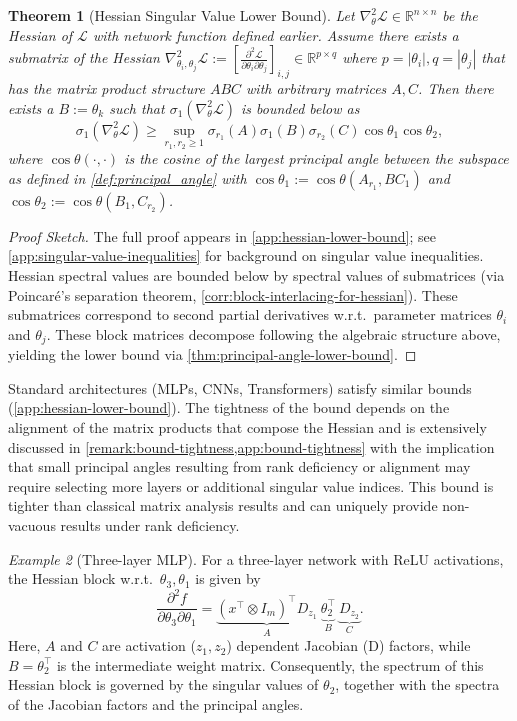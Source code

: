 \documentclass{article}
\newcommand{\prinangle}{\cos\theta}
\theoremstyle{plain}
\newtheorem{theorem}{Theorem}
\theoremstyle{definition}
\theoremstyle{remark}
\newtheorem{example}[theorem]{Example}
\begin{document}
\begin{theorem}[Hessian Singular Value Lower Bound]
\label{thm:hessian-singular-value-bound}
Let $\nabla^2_{\theta}\mathcal{L} \in \mathbb{R}^{n \times n}$ be the Hessian of $\mathcal{L}$ with network function defined earlier. Assume there exists a submatrix of the Hessian $\nabla^2_{\theta_i,\theta_j} \mathcal{L} :=  \left[\frac{\partial^2 \mathcal{L}}{\partial \theta_i \partial \theta_j}\right]_{i, j} \in \mathbb{R}^{p \times q}$ where $p = |\theta_i|, q = |\theta_j|$ that has the matrix product structure $ABC$ with arbitrary matrices $A,C$. Then there exists a $B := \theta_k$ such that  $\sigma_1(\nabla^2_{\theta}\mathcal{L})$ is bounded below as \[
\sigma_1(\nabla^2_{\theta}\mathcal{L}) \geq \sup_{r_1,r_2 \geq 1} \sigma_{r_1}(A)\sigma_{1}(B)\sigma_{r_2}(C) \prinangle_1\prinangle_2,
\] where $\prinangle(\cdot, \cdot)$ is the cosine of the largest principal angle between the subspace as defined in \cref{def:principal_angle} with $\prinangle_1 := \prinangle(A_{r_1},BC_1)$ and $\prinangle_2 :=\prinangle(B_1, C_{r_2})$.
\end{theorem}

\begin{proof}[Proof Sketch]
The full proof appears in \cref{app:hessian-lower-bound}; see \cref{app:singular-value-inequalities} for background on singular value inequalities. Hessian spectral values are bounded below by spectral values of submatrices (via Poincaré's separation theorem, \cref{corr:block-interlacing-for-hessian}). These submatrices correspond to second partial derivatives w.r.t.\ parameter matrices $\theta_i$ and $\theta_j$. These block matrices decompose following the algebraic structure above, yielding the lower bound via \cref{thm:principal-angle-lower-bound}.
\end{proof}

Standard architectures (MLPs, CNNs, Transformers) satisfy similar bounds (\cref{app:hessian-lower-bound}). The tightness of the bound depends on the alignment of the matrix products that compose the Hessian and is extensively discussed in \cref{remark:bound-tightness,app:bound-tightness} with the implication that small principal angles resulting from rank deficiency or alignment may require selecting more layers or additional singular value indices. This bound is tighter than classical matrix analysis results \citep{Horn_Johnson_1991, bhatia2013matrix} and can uniquely provide non-vacuous results under rank deficiency.

\begin{example}[Three-layer MLP]
For a three-layer network with ReLU activations, the Hessian block w.r.t.\ $\theta_3,\theta_1$ is given by \[
\frac{\partial^2 f}{\partial \theta_3 \partial \theta_1} =
\underbrace{(x^{\top} \otimes I_{m})^{\top} D_{z_1}}_{A} 
\:
\underbrace{\theta_2^{\top}}_B\:\underbrace{D_{z_2}}_C.
\] Here, $A$ and $C$ are activation ($z_1,z_2$) dependent Jacobian (D) factors, while $B=\theta_2^{\top}$ is the intermediate weight matrix. Consequently, the spectrum of this Hessian block is governed by the singular values of $\theta_2$, together with the spectra of the Jacobian factors and the principal angles.
\end{example}
\end{document}
